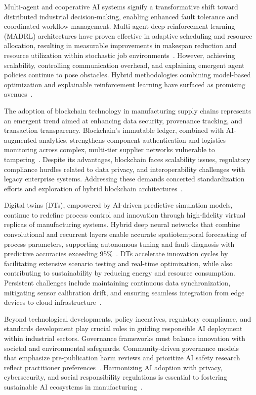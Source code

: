 \documentclass[sigconf]{acmart}
\begin{document}
Multi-agent and cooperative AI systems signify a transformative shift toward distributed industrial decision-making, enabling enhanced fault tolerance and coordinated workflow management. Multi-agent deep reinforcement learning (MADRL) architectures have proven effective in adaptive scheduling and resource allocation, resulting in measurable improvements in makespan reduction and resource utilization within stochastic job environments~\cite{ref29}. However, achieving scalability, controlling communication overhead, and explaining emergent agent policies continue to pose obstacles. Hybrid methodologies combining model-based optimization and explainable reinforcement learning have surfaced as promising avenues~\cite{ref29,ref37}.

The adoption of blockchain technology in manufacturing supply chains represents an emergent trend aimed at enhancing data security, provenance tracking, and transaction transparency. Blockchain's immutable ledger, combined with AI-augmented analytics, strengthens component authentication and logistics monitoring across complex, multi-tier supplier networks vulnerable to tampering~\cite{ref25}. Despite its advantages, blockchain faces scalability issues, regulatory compliance hurdles related to data privacy, and interoperability challenges with legacy enterprise systems. Addressing these demands concerted standardization efforts and exploration of hybrid blockchain architectures~\cite{ref41}.

Digital twins (DTs), empowered by AI-driven predictive simulation models, continue to redefine process control and innovation through high-fidelity virtual replicas of manufacturing systems. Hybrid deep neural networks that combine convolutional and recurrent layers enable accurate spatiotemporal forecasting of process parameters, supporting autonomous tuning and fault diagnosis with predictive accuracies exceeding 95\%~\cite{ref26}. DTs accelerate innovation cycles by facilitating extensive scenario testing and real-time optimization, while also contributing to sustainability by reducing energy and resource consumption. Persistent challenges include maintaining continuous data synchronization, mitigating sensor calibration drift, and ensuring seamless integration from edge devices to cloud infrastructure~\cite{ref26,ref38}.

Beyond technological developments, policy incentives, regulatory compliance, and standards development play crucial roles in guiding responsible AI deployment within industrial sectors. Governance frameworks must balance innovation with societal and environmental safeguards. Community-driven governance models that emphasize pre-publication harm reviews and prioritize AI safety research reflect practitioner preferences~\cite{ref25}. Harmonizing AI adoption with privacy, cybersecurity, and social responsibility regulations is essential to fostering sustainable AI ecosystems in manufacturing~\cite{ref44}.
\end{document}
